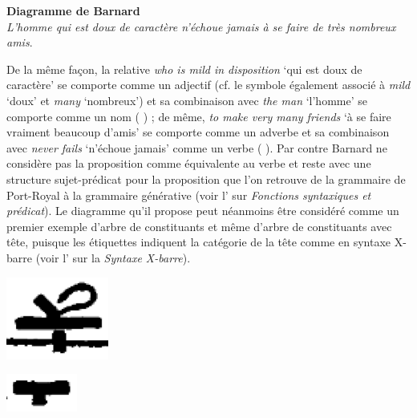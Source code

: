{    \textbf{Diagramme de Barnard\\}
    \textit{L’homme qui est doux de caractère n’échoue jamais à se faire de très nombreux amis}.

    De la même façon, la relative \textit{who is mild in disposition} ‘qui est doux de caractère’ se comporte comme un adjectif (cf. le symbole       également associé à \textit{mild} ‘doux’ et \textit{many} ‘nombreux’) et sa combinaison avec \textit{the man} ‘l’homme’ se comporte comme un nom (   ) ; de même, \textit{to make very many friends} ‘à se faire vraiment beaucoup d’amis’ se comporte comme un adverbe et sa combinaison avec \textit{never fails} ‘n’échoue jamais’ comme un verbe (        ). Par contre Barnard ne considère pas la proposition comme équivalente au verbe et reste avec une structure sujet-prédicat pour la proposition que l’on retrouve de la grammaire de Port-Royal à la grammaire générative (voir l’ sur \textit{Fonctions syntaxiques et prédicat}). Le diagramme qu’il propose peut néanmoins être considéré comme un premier exemple d’arbre de constituants et même d’arbre de constituants avec tête, puisque les étiquettes indiquent la catégorie de la tête comme en syntaxe X-barre (voir l’ sur la \textit{Syntaxe X-barre}).

    \includegraphics[width=\textwidth]{figures/vol1syntaxe2-img020.png}

    \includegraphics[width=\textwidth]{figures/vol1syntaxe2-img021.png}

}
